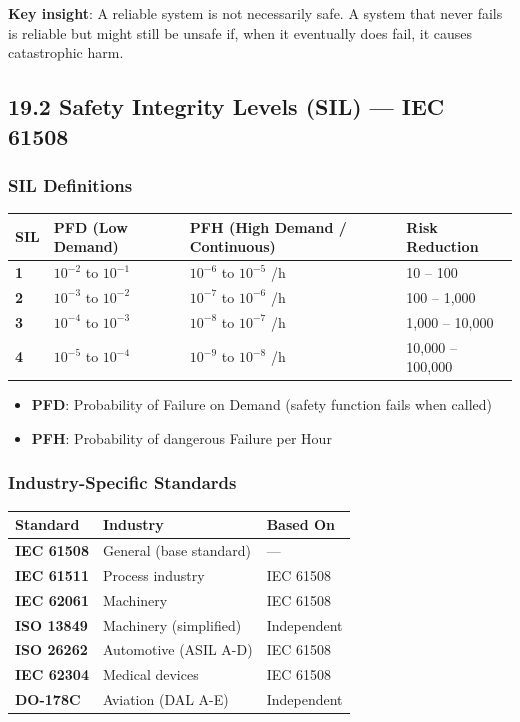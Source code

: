 \documentclass[11pt,a4paper]{book}
\begin{document}
\begin{itemize}
\textbf{Key insight}: A reliable system is not necessarily safe. A system that never fails is reliable but might still be unsafe if, when it eventually does fail, it causes catastrophic harm.

\medskip\noindent\hrulefill\medskip

\subsection{19.2 Safety Integrity Levels (SIL) — IEC 61508}

\subsubsection{SIL Definitions}

\begin{center}
\begin{tabular}{|l|l|l|l|}
\hline
SIL & PFD (Low Demand) & PFH (High Demand / Continuous) & Risk Reduction \\
\hline
\textbf{1} & $10^{-2}$ to $10^{-1}$ & $10^{-6}$ to $10^{-5}$ /h & 10 – 100 \\
\textbf{2} & $10^{-3}$ to $10^{-2}$ & $10^{-7}$ to $10^{-6}$ /h & 100 – 1,000 \\
\textbf{3} & $10^{-4}$ to $10^{-3}$ & $10^{-8}$ to $10^{-7}$ /h & 1,000 – 10,000 \\
\textbf{4} & $10^{-5}$ to $10^{-4}$ & $10^{-9}$ to $10^{-8}$ /h & 10,000 – 100,000 \\
\hline
\end{tabular}
\end{center}

\begin{itemize}
\item \textbf{PFD}: Probability of Failure on Demand (safety function fails when called)
\item \textbf{PFH}: Probability of dangerous Failure per Hour
\end{itemize}

\subsubsection{Industry-Specific Standards}

\begin{center}
\begin{tabular}{|l|l|l|}
\hline
Standard & Industry & Based On \\
\hline
\textbf{IEC 61508} & General (base standard) & — \\
\textbf{IEC 61511} & Process industry & IEC 61508 \\
\textbf{IEC 62061} & Machinery & IEC 61508 \\
\textbf{ISO 13849} & Machinery (simplified) & Independent \\
\textbf{ISO 26262} & Automotive (ASIL A-D) & IEC 61508 \\
\textbf{IEC 62304} & Medical devices & IEC 61508 \\
\textbf{DO-178C} & Aviation (DAL A-E) & Independent \\
\hline
\end{tabular}
\end{center}


\end{itemize}
\end{document}
